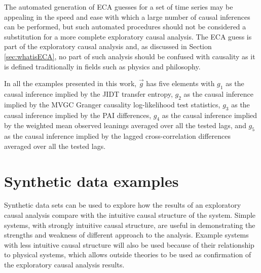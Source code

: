 The automated generation of ECA guesses for a set of time series may be appealing in the speed and ease with which a large number of causal inferences can be performed, but such automated procedures should not be considered a substitution for a more complete exploratory causal analysis.  The ECA guess is part of the exploratory causal analysis and, as discussed in Section \ref{sec:whatisECA}, no part of such analysis should be confused with causality as it is defined traditionally in fields such as physics and philosophy.

In all the examples presented in this work, $\vec{g}$ has five elements with $g_1$ as the causal inference implied by the JIDT transfer entropy, $g_2$ as the causal inference implied by the MVGC Granger causality log-likelihood test statistics, $g_3$ as the causal inference implied by the PAI differences, $g_4$ as the causal inference implied by the weighted mean observed leanings averaged over all the tested lags, and $g_5$ as the causal inference implied by the lagged cross-correlation differences averaged over all the tested lags.

\section{Synthetic data examples}
Synthetic data sets can be used to explore how the results of an exploratory causal analysis compare with the intuitive causal structure of the system.  Simple systems, with strongly intuitive causal structure, are useful in demonstrating the strengths and weakness of different approach to the analysis.  Example systems with less intuitive causal structure will also be used because of their relationship to physical systems, which allows outside theories to be used as confirmation of the exploratory causal analysis results. 


